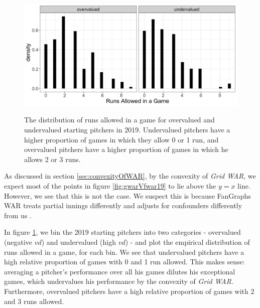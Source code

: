 \documentclass[12pt]{article}
\begin{document}
\begin{figure}[t!]
\centering
\caption{The distribution of runs allowed in a game for overvalued and undervalued starting pitchers in 2019. Undervalued pitchers have a higher proportion of games in which they allow 0 or 1 run, and overvalued pitchers have a higher proportion of games in which he allows 2 or 3 runs.} 
\includegraphics[width=15cm]{../writeup_plots/plot_cumRuns_aggregated_2019.png}
\label{fig:cumRunsAggregated19}
\end{figure}

As discussed in section \ref{sec:convexityOfWAR}, by the convexity of \textit{Grid WAR}, we expect most of the points in figure \ref{fig:gwarVfwar19} to lie above the $y=x$ line. However, we see that this is not the case. We suspect this is because FanGraphs WAR
treats partial innings differently and adjusts for confounders differently from us \citep{war_FG}. %

In figure \ref{fig:cumRunsAggregated19}, we bin the 2019 starting pitchers into two categories - overvalued (negative $vd$) and undervalued (high $vd$) - and plot the empirical distribution of runs allowed in a game, for each bin. We see that undervalued pitchers have a high relative proportion of games with 0 and 1 run allowed. This makes sense: averaging a pitcher's performance over all his games dilutes his exceptional games, which undervalues his performance by the convexity of \textit{Grid WAR}. Furthermore, overvalued pitchers have a high relative proportion of games with 2 and 3 runs allowed.
\end{document}
